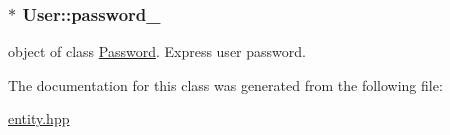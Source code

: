 \subsubsection[{\texorpdfstring{password\+\_\+}{password_}}]{$\ast$ User\+::password\+\_\+\hspace{0.3cm}{\ttfamily [private]}}\hypertarget{classUser_a63aba4db6a08c1e037680da39add69e7}{}\label{classUser_a63aba4db6a08c1e037680da39add69e7}
object of class \hyperlink{classPassword}{Password}. Express user password. 

The documentation for this class was generated from the following file\+:\begin{DoxyCompactItemize}
\item 
\hyperlink{entity_8hpp}{entity.\+hpp}\end{DoxyCompactItemize}
